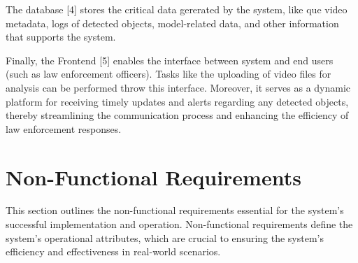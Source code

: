 The database [4] stores the critical data gererated by the system, like que video metadata, logs of detected objects, 
model-related data, and other information that supports the system.

Finally, the Frontend [5] enables the interface between system and end users (such as law enforcement officers). Tasks like the uploading of video files for analysis can be performed throw  this interface. Moreover, it serves as a dynamic platform for receiving timely updates and alerts regarding any detected objects, thereby streamlining the communication process and enhancing the efficiency of law enforcement responses.

\section{Non-Functional Requirements}
This section outlines the non-functional requirements essential for the system's successful implementation and operation.
Non-functional requirements define the system's operational attributes, which are crucial to ensuring the system's 
efficiency and effectiveness in real-world scenarios. 

